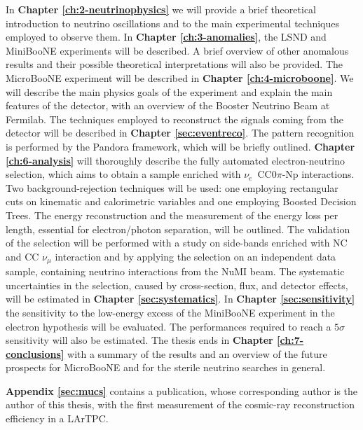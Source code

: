 In \textbf{Chapter \ref{ch:2-neutrinophysics}} we will provide a brief theoretical introduction to neutrino oscillations and to the main experimental techniques employed to observe them.
In \textbf{Chapter \ref{ch:3-anomalies}}, the LSND and MiniBooNE experiments will be described. A brief overview of other anomalous results and their possible theoretical interpretations will also be provided.
The MicroBooNE experiment will be described in \textbf{Chapter \ref{ch:4-microboone}}. We will describe the main physics goals of the experiment and explain the main features of the detector, with an overview of the Booster Neutrino Beam at Fermilab.
The techniques employed to reconstruct the signals coming from the detector will be described in \textbf{Chapter \ref{sec:eventreco}}. The pattern recognition is performed by the Pandora framework, which will be briefly outlined.
\textbf{Chapter \ref{ch:6-analysis}} will thoroughly describe the fully automated electron-neutrino selection, which aims to obtain a sample enriched with $\nu_e$~CC0$\pi$-Np interactions. Two background-rejection techniques will be used: one employing rectangular cuts on kinematic and calorimetric variables and one employing Boosted Decision Trees. The energy reconstruction and the measurement of the energy loss per length, essential for electron/photon separation, will be outlined. The validation of the selection will be performed with a study on side-bands enriched with NC and CC $\nu_{\mu}$ interaction and by applying the selection on an independent data sample, containing neutrino interactions from the NuMI beam. The systematic uncertainties in the selection, caused by cross-section, flux, and detector effects, will be estimated in \textbf{Chapter \ref{sec:systematics}}.
In \textbf{Chapter \ref{sec:sensitivity}} the sensitivity to the low-energy excess of the MiniBooNE experiment in the electron hypothesis will be evaluated. The performances required to reach a $5\sigma$ sensitivity will also be estimated.
The thesis ends in \textbf{Chapter \ref{ch:7-conclusions}} with a summary of the results and an overview of the future prospects for MicroBooNE and for the sterile neutrino searches in general. 

\vspace{1em}

\textbf{Appendix \ref{sec:mucs}} contains a publication, whose corresponding author is the author of this thesis, with the first measurement of the cosmic-ray reconstruction efficiency in a LArTPC.